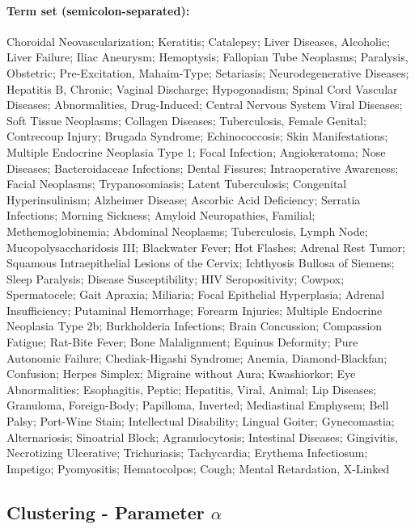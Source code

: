 \paragraph{Term set (semicolon-separated):}$ $\\
Choroidal Neovascularization; Keratitis; Catalepsy; Liver Diseases, Alcoholic; Liver Failure; Iliac Aneurysm; Hemoptysis; Fallopian Tube Neoplasms;
Paralysis, Obstetric; Pre-Excitation, Mahaim-Type; Setariasis; Neurodegenerative Diseases; Hepatitis B, Chronic; Vaginal Discharge; Hypogonadism;
Spinal Cord Vascular Diseases; Abnormalities, Drug-Induced; Central Nervous System Viral Diseases; Soft Tissue Neoplasms; Collagen Diseases; 
Tuberculosis, Female Genital; Contrecoup Injury; Brugada Syndrome; Echinococcosis; Skin Manifestations; Multiple Endocrine Neoplasia Type 1; 
Focal Infection; Angiokeratoma; Nose Diseases; Bacteroidaceae Infections; Dental Fissures; Intraoperative Awareness; Facial Neoplasms; Trypanosomiasis;
Latent Tuberculosis; Congenital Hyperinsulinism; Alzheimer Disease; Ascorbic Acid Deficiency; Serratia Infections; Morning Sickness; 
Amyloid Neuropathies, Familial; Methemoglobinemia; Abdominal Neoplasms; Tuberculosis, Lymph Node; Mucopolysaccharidosis III; Blackwater Fever; Hot Flashes;
Adrenal Rest Tumor; Squamous Intraepithelial Lesions of the Cervix; Ichthyosis Bullosa of Siemens; Sleep Paralysis; Disease Susceptibility; 
HIV Seropositivity; Cowpox; Spermatocele; Gait Apraxia; Miliaria; Focal Epithelial Hyperplasia; Adrenal Insufficiency; Putaminal Hemorrhage; 
Forearm Injuries; Multiple Endocrine Neoplasia Type 2b; Burkholderia Infections; Brain Concussion; Compassion Fatigue; Rat-Bite Fever; Bone Malalignment;
Equinus Deformity; Pure Autonomic Failure; Chediak-Higashi Syndrome; Anemia, Diamond-Blackfan; Confusion; Herpes Simplex; Migraine without Aura;
Kwashiorkor; Eye Abnormalities; Esophagitis, Peptic; Hepatitis, Viral, Animal; Lip Diseases; Granuloma, Foreign-Body; Papilloma, Inverted; 
Mediastinal Emphysem; Bell Palsy; Port-Wine Stain; Intellectual Disability; Lingual Goiter; Gynecomastia; Alternariosis; Sinoatrial Block; Agranulocytosis;
Intestinal Diseases; Gingivitis, Necrotizing Ulcerative; Trichuriasis; Tachycardia; Erythema Infectiosum; Impetigo; Pyomyositis; Hematocolpos; Cough;
Mental Retardation, X-Linked


\newpage
\subsection{Clustering - Parameter $\alpha$}
\label{app:alpha}

